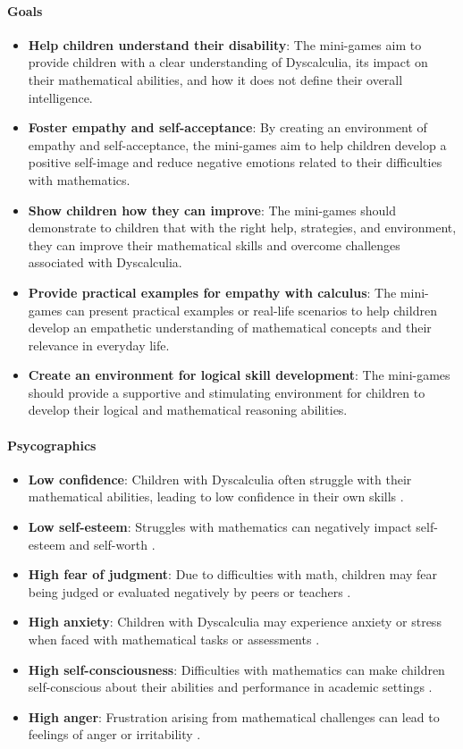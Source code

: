 \paragraph{Goals}
\begin{itemize}
    \item \textbf{Help children understand their disability}: The mini-games aim to provide children with a clear understanding of Dyscalculia, its impact on their mathematical abilities, and how it does not define their overall intelligence.
    \item \textbf{Foster empathy and self-acceptance}: By creating an environment of empathy and self-acceptance, the mini-games aim to help children develop a positive self-image and reduce negative emotions related to their difficulties with mathematics.
    \item \textbf{Show children how they can improve}: The mini-games should demonstrate to children that with the right help, strategies, and environment, they can improve their mathematical skills and overcome challenges associated with Dyscalculia.
    \item \textbf{Provide practical examples for empathy with calculus}: The mini-games can present practical examples or real-life scenarios to help children develop an empathetic understanding of mathematical concepts and their relevance in everyday life.
    \item \textbf{Create an environment for logical skill development}: The mini-games should provide a supportive and stimulating environment for children to develop their logical and mathematical reasoning abilities.
\end{itemize}

\paragraph{Psycographics}
\begin{itemize}
    \item \textbf{Low confidence}: Children with Dyscalculia often struggle with their mathematical abilities, leading to low confidence in their own skills \cite{understood2024}.
    \item \textbf{Low self-esteem}: Struggles with mathematics can negatively impact self-esteem and self-worth \cite{clevelandclinic2024}.
    \item \textbf{High fear of judgment}: Due to difficulties with math, children may fear being judged or evaluated negatively by peers or teachers \cite{understood2024}.
    \item \textbf{High anxiety}: Children with Dyscalculia may experience anxiety or stress when faced with mathematical tasks or assessments \cite{pmc2024}.
    \item \textbf{High self-consciousness}: Difficulties with mathematics can make children self-conscious about their abilities and performance in academic settings \cite{understood2024}.
    \item \textbf{High anger}: Frustration arising from mathematical challenges can lead to feelings of anger or irritability \cite{clevelandclinic2024}.
\end{itemize}

